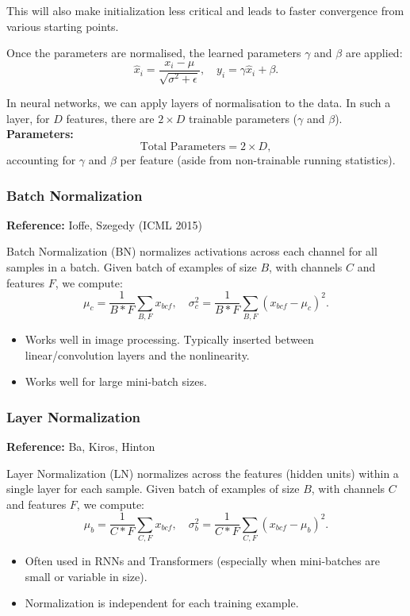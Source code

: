 \documentclass{article}
\begin{document}
This will also make initialization less critical and leads to faster convergence from various starting points.

Once the parameters are normalised, the learned parameters \(\gamma\) and \(\beta\) are applied:
\[
\hat{x}_i = \frac{x_i - \mu}{\sqrt{\sigma^2 + \epsilon}},\quad y_i = \gamma \hat{x}_i + \beta.
\]

In neural networks, we can apply layers of normalisation to the data. In such a layer, for \(D\) features, there are \(2 \times D\) trainable parameters (\(\gamma\) and \(\beta\)).
\textbf{Parameters:}
\[
\text{Total Parameters} = 2 \times D,
\]
accounting for $\gamma$ and $\beta$ per feature (aside from non-trainable running statistics).

\subsubsection{Batch Normalization}
\label{sec:batchnorm}

\textbf{Reference:} Ioffe, Szegedy (ICML 2015)

Batch Normalization (BN) normalizes activations across each channel for all samples in a batch.  
Given batch of examples of size $B$, with channels $C$ and features $F$, we compute:
\[
\mu_c = \frac{1}{B*F} \sum_{B,F} x_{bcf}, 
\quad
\sigma^2_c = \frac{1}{B*F} \sum_{B,F} (x_{bcf} - \mu_c)^2.
\]

\begin{itemize}
    \item Works well in image processing. Typically inserted between linear/convolution layers and the nonlinearity.
    \item Works well for large mini-batch sizes.
\end{itemize}

\subsubsection{Layer Normalization}
\label{sec:layernorm}

\textbf{Reference:} Ba, Kiros, Hinton

Layer Normalization (LN) normalizes across the features (hidden units) within a single layer for each sample. Given batch of examples of size $B$, with channels $C$ and features $F$, we compute:
\[
\mu_b = \frac{1}{C*F} \sum_{C,F} x_{bcf}, 
\quad
\sigma^2_b = \frac{1}{C*F} \sum_{C,F} (x_{bcf} - \mu_b)^2.
\]

\begin{itemize}
    \item Often used in RNNs and Transformers (especially when mini-batches are small or variable in size).
    \item Normalization is independent for each training example.
\end{itemize}
\end{document}
